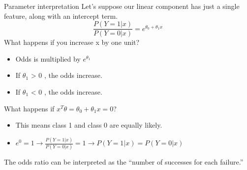 \documentclass[aspectratio=169]{../latex_main/tntbeamer}  %
\begin{document}
	
	\begin{frame}{Parameter interpretation}
	  Let’s suppose our linear component has just a single feature, along with an intercept term.
	   \begin{equation*}
	       \frac{P(Y=1|x)}{P(Y=0|x)} = e^{\theta_0 + \theta_1x}
	   \end{equation*}
	  What happens if you increase x by one unit?
	  \begin{itemize}
	      \item Odds is multiplied by $e^{\theta_1}$
	      \item If      $\theta_1$ > 0         , the odds increase.
	      \item If         $\theta_1$ < 0      , the odds increase.
	  \end{itemize}
	  What happens if              $x^T\theta = \theta_0 + \theta_1x = 0$?
	  \begin{itemize}
	      \item This means class 1 and class 0 are equally likely.
	      \item $e^0 = 1 \rightarrow \frac{P(Y=1|x)}{P(Y=0|x)} = 1 \rightarrow P(Y=1|x) = P(Y=0|x)$
	  \end{itemize}
	  The odds ratio can be interpreted as the “number of successes for each failure.”
	\end{frame}
\end{document}
